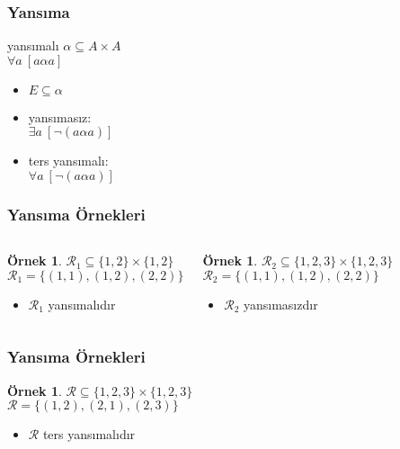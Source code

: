 \documentclass[dvipsnames]{beamer}
\theoremstyle{definition}
\theoremstyle{example}
\newtheorem{ornek}[theorem]{Örnek}
\theoremstyle{plain}
\begin{document}
\begin{frame}
  \frametitle{Yansıma}

  \begin{block}{yansımalı}
    $\alpha \subseteq A \times A$\\
    $\forall a~[a \alpha a]$
  \end{block}

  \pause
  \begin{itemize}
    \item $E \subseteq \alpha$

    \pause
    \item yansımasız:\\
      $\exists a~[\neg (a \alpha a)]$

    \pause
    \item ters yansımalı:\\
      $\forall a~[\neg (a \alpha a)]$
  \end{itemize}
\end{frame}

\begin{frame}
  \frametitle{Yansıma Örnekleri}

  \begin{columns}[t]
    \begin{ornek}
      $\mathcal{R}_1 \subseteq \{1,2\} \times \{1,2\}$\\
      $\mathcal{R}_1 = \{(1,1), (1,2), (2,2)\}$

      \medskip
      \begin{itemize}
        \item $\mathcal{R}_1$ yansımalıdır
      \end{itemize}
    \end{ornek}

    \pause
    \begin{ornek}
      $\mathcal{R}_2 \subseteq \{1,2,3\} \times \{1,2,3\}$\\
      $\mathcal{R}_2 = \{(1,1), (1,2), (2,2)\}$

      \medskip
      \begin{itemize}
        \item $\mathcal{R}_2$ yansımasızdır
      \end{itemize}
    \end{ornek}
  \end{columns}
\end{frame}

\begin{frame}
  \frametitle{Yansıma Örnekleri}

  \begin{ornek}
    $\mathcal{R} \subseteq \{1,2,3\} \times \{1,2,3\}$\\
    $\mathcal{R} = \{(1,2), (2,1), (2,3)\}$

    \medskip
    \begin{itemize}
      \item $\mathcal{R}$ ters yansımalıdır
    \end{itemize}
  \end{ornek}
\end{frame}
\end{document}
